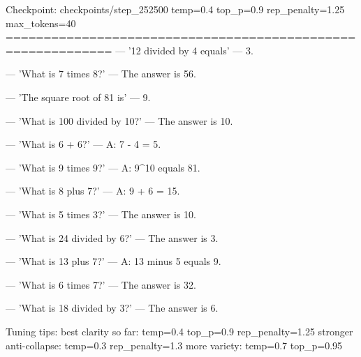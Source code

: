 Checkpoint: checkpoints/step_252500
temp=0.4 top_p=0.9 rep_penalty=1.25 max_tokens=40
============================================================
--- '12 divided by 4 equals' ---
3.

--- 'What is 7 times 8?' ---
The answer is 56.

--- 'The square root of 81 is' ---
9.

--- 'What is 100 divided by 10?' ---
The answer is 10.

--- 'What is 6 + 6?' ---
A: 7 - 4 = 5.

--- 'What is 9 times 9?' ---
A: 9^10 equals 81.

--- 'What is 8 plus 7?' ---
A: 9 + 6 = 15.

--- 'What is 5 times 3?' ---
The answer is 10.

--- 'What is 24 divided by 6?' ---
The answer is 3.

--- 'What is 13 plus 7?' ---
A: 13 minus 5 equals 9.

--- 'What is 6 times 7?' ---
The answer is 32.

--- 'What is 18 divided by 3?' ---
The answer is 6.


Tuning tips:
  best clarity so far: temp=0.4 top_p=0.9 rep_penalty=1.25
  stronger anti-collapse: temp=0.3 rep_penalty=1.3
  more variety: temp=0.7 top_p=0.95
